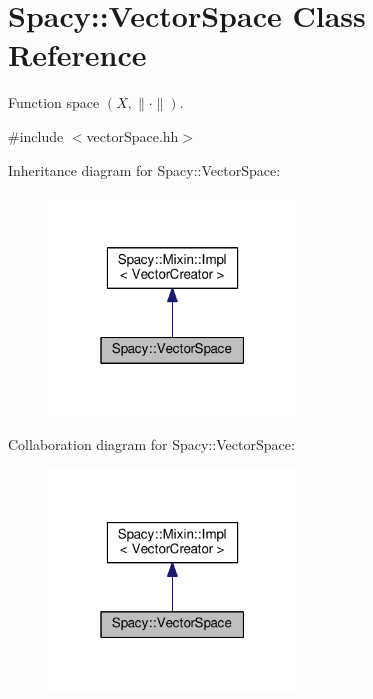 \hypertarget{classSpacy_1_1VectorSpace}{}\section{Spacy\+:\+:Vector\+Space Class Reference}
\label{classSpacy_1_1VectorSpace}


Function space $(X,\|\cdot\|)$.  




{\ttfamily \#include $<$vector\+Space.\+hh$>$}



Inheritance diagram for Spacy\+:\+:Vector\+Space\+:\nopagebreak
\begin{figure}[H]
\begin{center}
\leavevmode
\includegraphics[width=187pt]{classSpacy_1_1VectorSpace__inherit__graph}
\end{center}
\end{figure}


Collaboration diagram for Spacy\+:\+:Vector\+Space\+:\nopagebreak
\begin{figure}[H]
\begin{center}
\leavevmode
\includegraphics[width=187pt]{classSpacy_1_1VectorSpace__coll__graph}
\end{center}
\end{figure}

